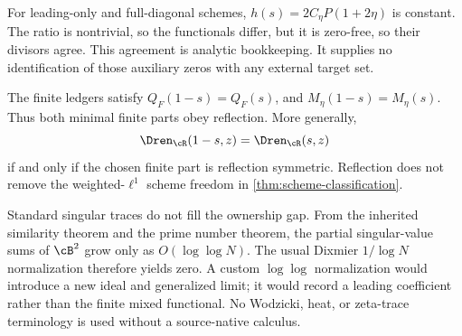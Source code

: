 For leading-only and full-diagonal schemes,
$h(s)=2C_\eta P(1+2\eta)$ is constant.  The ratio is nontrivial, so the
functionals differ, but it is zero-free, so their divisors agree.  This
agreement is analytic bookkeeping.  It supplies no identification of those
auxiliary zeros with any external target set.

The finite ledgers satisfy $Q_F(1-s)=Q_F(s)$, and
$M_\eta(1-s)=M_\eta(s)$.  Thus both minimal finite parts obey reflection.
More generally,
\begin{equation}
 \Dren_{\cR}(1-s,z)=\Dren_{\cR}(s,z)
 \label{eq:Dren-reflection}
\end{equation}
if and only if the chosen finite part is reflection symmetric.  Reflection
does not remove the weighted-$\ell^1$ scheme freedom in
\cref{thm:scheme-classification}.

Standard singular traces do not fill the ownership gap.  From the inherited
similarity theorem and the prime number theorem, the partial singular-value
sums of $\cB^2$ grow only as $O(\log\log N)$.  The usual Dixmier
$1/\log N$ normalization therefore yields zero.  A custom
$\log\log$ normalization would introduce a new ideal and generalized limit;
it would record a leading coefficient rather than the finite mixed
functional.  No Wodzicki, heat, or zeta-trace terminology is used without a
source-native calculus.
